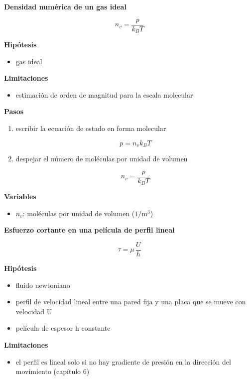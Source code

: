 \documentclass[10pt,openany]{book}
\begin{document}
\begin{tcolorbox}[title={Desarrollos del modelo}, studiumdef, breakable]
\noindent\textbf{Densidad numérica de un gas ideal}

\begin{equation}
n_v = \frac{p}{k_B T}
\label{eq:c03-densidad-numerica}
\end{equation}

\noindent\textbf{Hipótesis}
\begin{itemize}
\item gas ideal
\end{itemize}

\noindent\textbf{Limitaciones}
\begin{itemize}
\item estimación de orden de magnitud para la escala molecular
\end{itemize}

\noindent\textbf{Pasos}
\begin{enumerate}
\item
escribir la ecuación de estado en forma molecular

\[
p = n_v k_B T
\]
\item
despejar el número de moléculas por unidad de volumen

\[
n_v = \frac{p}{k_B T}
\]
\end{enumerate}

\noindent\textbf{Variables}
\begin{itemize}
\item $n_{v}$: moléculas por unidad de volumen ($\mathrm{1/m^3}$)
\end{itemize}



\noindent\textbf{Esfuerzo cortante en una película de perfil lineal}

\begin{equation}
\tau = \mu\,\frac{U}{h}
\label{eq:c03-pelicula}
\end{equation}

\noindent\textbf{Hipótesis}
\begin{itemize}
\item fluido newtoniano
\item perfil de velocidad lineal entre una pared fija y una placa que se mueve con velocidad U
\item película de espesor h constante
\end{itemize}

\noindent\textbf{Limitaciones}
\begin{itemize}
\item el perfil es lineal solo si no hay gradiente de presión en la dirección del movimiento (capítulo 6)
\end{itemize}


\end{tcolorbox}
\end{document}
